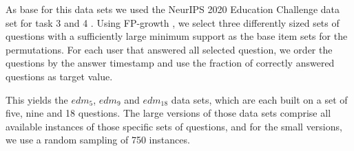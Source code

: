 As base for this data sets we used the NeurIPS 2020 Education Challenge data set for task 3 and 4 \cite{neurips_data}. Using FP-growth \cite{fpgrowth}, we select three differently sized sets of questions with a sufficiently large minimum support as the base item sets for the permutations. For each user that answered all selected question, we order the questions by the answer timestamp and use the fraction of correctly answered questions as target value.


This yields the $edm_5$, $edm_9$ and $edm_{18}$ data sets, which are each built on a set of five, nine and 18 questions. The large versions of those data sets comprise all available instances of those specific sets of questions, and for the small versions, we use a random sampling of 750 instances.